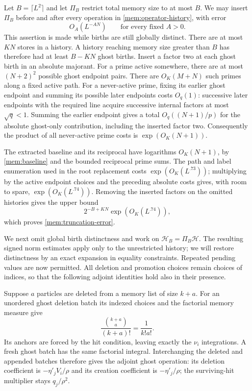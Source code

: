 Let $B=\lceil L^2\rceil$ and let $\Pi_B$ restrict total memory size to
at most $B$. We may insert $\Pi_B$ before and after every operation in
\eqref{mem:operator-history}, with error
\begin{equation}\label{mem:truncation-error}
 O_A(L^{-AN})\qquad\text{for every fixed }A>0.
\end{equation}
This assertion is made while births are still globally distinct.
There are at most $KN$ stores in a history. A history reaching memory
size greater than $B$ has therefore had at least $B-KN$ ghost births.
Insert a factor two at each ghost birth in an absolute majorant.
For a prime active somewhere, there are at most $(N+2)^2$ possible
ghost endpoint pairs. There are $O_K(M+N)$ such primes along a fixed
active path. For a never-active prime, fixing its earlier ghost endpoint
and summing its possible later endpoints costs $O_q(1)$: successive
later endpoints with the required line acquire successive internal
factors at most $\sqrt q<1$. Summing the earlier endpoint gives a
total $O_q((N+1)/p)$ for the absolute ghost-only contribution, including
the inserted factor two. Consequently the product of all never-active
prime costs is $\exp(O_K(N+1))$.

The extracted baseline and its reciprocal have logarithms
$O_K(N+1)$, by \eqref{mem:baseline} and the bounded reciprocal prime
sums. The path and label enumeration used in the root replacement
costs $\exp(O_K(L^{.73}))$; multiplying by the active endpoint choices
and the preceding absolute costs gives, with room to spare,
$\exp(O_K(L^{.74}))$. Removing the inserted factors on the omitted
histories gives the upper bound
\[
 2^{-B+KN}\exp(O_K(L^{.74})),
\]
which proves \eqref{mem:truncation-error}.

We next omit global birth distinctness and work on
$\mathscr H_B=\Pi_B\mathscr H$. The resulting signed norm estimates
apply only to the unrestricted history; we will restore distinctness
by an exact expansion in equality constraints. Repeated pending values
are now permitted. All deletion and promotion choices remain choices
of indices, so that the following
adjoint identities hold also in their presence.

Suppose $a$ particles are deleted from a memory list of size $k+a$.
For an unordered ghost deletion batch its indexed choices and the
factorial memory measure give
\begin{equation}\label{mem:ghost-factorial}
 \frac{\binom{k+a}{a}}{(k+a)!}=\frac{1}{k!a!}.
\end{equation}
Its anchors are forced by the hit condition, leaving exactly the
$\nu_i$ integrations. A fresh ghost batch has the same factorial
integral. Interchanging the deleted and appended batches therefore
gives the adjoint ghost operation: its deletion coefficient is
$-\eta'_jV_i/\rho$ and its creation coefficient is $-\eta'_j/\rho$;
the surviving-hit multiplier stays $q_j/\rho^2$.

